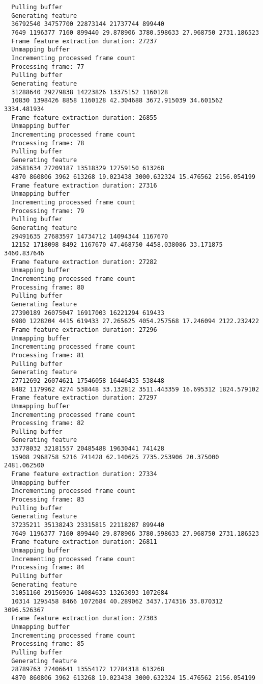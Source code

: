 \documentclass[12pt,oneside]{book}
\begin{document}
\begin{lstlisting}
  Pulling buffer
  Generating feature
  36792540 34757700 22873144 21737744 899440
  7649 1196377 7160 899440 29.878906 3780.598633 27.968750 2731.186523
  Frame feature extraction duration: 27237
  Unmapping buffer
  Incrementing processed frame count
  Processing frame: 77
  Pulling buffer
  Generating feature
  31288640 29279838 14223826 13375152 1160128
  10830 1398426 8858 1160128 42.304688 3672.915039 34.601562 3334.481934
  Frame feature extraction duration: 26855
  Unmapping buffer
  Incrementing processed frame count
  Processing frame: 78
  Pulling buffer
  Generating feature
  28581634 27209187 13518329 12759150 613268
  4870 860806 3962 613268 19.023438 3000.632324 15.476562 2156.054199
  Frame feature extraction duration: 27316
  Unmapping buffer
  Incrementing processed frame count
  Processing frame: 79
  Pulling buffer
  Generating feature
  29491635 27683597 14734712 14094344 1167670
  12152 1718098 8492 1167670 47.468750 4458.038086 33.171875 3460.837646
  Frame feature extraction duration: 27282
  Unmapping buffer
  Incrementing processed frame count
  Processing frame: 80
  Pulling buffer
  Generating feature
  27390189 26075047 16917003 16221294 619433
  6980 1228204 4415 619433 27.265625 4054.257568 17.246094 2122.232422
  Frame feature extraction duration: 27296
  Unmapping buffer
  Incrementing processed frame count
  Processing frame: 81
  Pulling buffer
  Generating feature
  27712692 26074621 17546058 16446435 538448
  8482 1179962 4274 538448 33.132812 3511.443359 16.695312 1824.579102
  Frame feature extraction duration: 27297
  Unmapping buffer
  Incrementing processed frame count
  Processing frame: 82
  Pulling buffer
  Generating feature
  33778032 32181557 20485488 19630441 741428
  15908 2968758 5216 741428 62.140625 7735.253906 20.375000 2481.062500
  Frame feature extraction duration: 27334
  Unmapping buffer
  Incrementing processed frame count
  Processing frame: 83
  Pulling buffer
  Generating feature
  37235211 35138243 23315815 22118287 899440
  7649 1196377 7160 899440 29.878906 3780.598633 27.968750 2731.186523
  Frame feature extraction duration: 26811
  Unmapping buffer
  Incrementing processed frame count
  Processing frame: 84
  Pulling buffer
  Generating feature
  31051160 29156936 14084633 13263093 1072684
  10314 1295458 8466 1072684 40.289062 3437.174316 33.070312 3096.526367
  Frame feature extraction duration: 27303
  Unmapping buffer
  Incrementing processed frame count
  Processing frame: 85
  Pulling buffer
  Generating feature
  28789763 27406641 13554172 12784318 613268
  4870 860806 3962 613268 19.023438 3000.632324 15.476562 2156.054199

\end{lstlisting}
\end{document}
